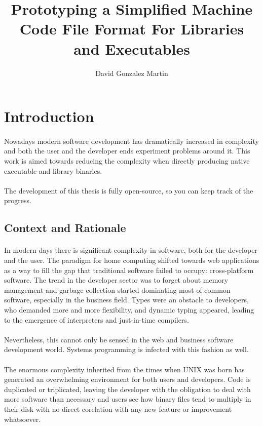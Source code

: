 \documentclass[12pt]{article}
\title{\vspace{-2.5cm}\textbf{Prototyping a Simplified Machine Code File Format For Libraries and Executables}}
\author{David Gonzalez Martin}
\date{\vspace{-5ex}}
\begin{document}
	\maketitle{\vspace{-1.5cm}}
	\newpage
	\tableofcontents
	\newpage
	\section{Introduction}
	\paragraph{} Nowadays modern software development has dramatically increased in complexity and both the user and the developer ends experiment problems around it. This work is aimed towards reducing the complexity when directly producing native executable and library binaries.
	\paragraph{} The development of this thesis is fully open-source, so you can keep track of the progress\cite{self}.\\
	\subsection{Context and Rationale}
	\paragraph{}In modern days there is significant complexity in software, both for the developer and the user. The paradigm for home computing shifted towards web applications as a way to fill the gap that traditional software failed to occupy: cross-platform software. The trend in the developer sector was to forget about memory management and garbage collection started dominating most of common software, especially in the business field. Types were an obstacle to developers, who demanded more and more flexibility, and dynamic typing appeared, leading to the emergence of interpreters and just-in-time compilers.
	\paragraph{}Nevertheless, this cannot only be sensed in the web and business software development world. Systems programming is infected with this fashion as well.
	\paragraph{} The enormous complexity inherited from the times when UNIX was born has generated an overwhelming environment for both users and developers. Code is duplicated or triplicated, leaving the developer with the obligation to deal with more software than necessary and users see how binary files tend to multiply in their disk with no direct corelation with any new feature or improvement whatsoever.
\end{document}
